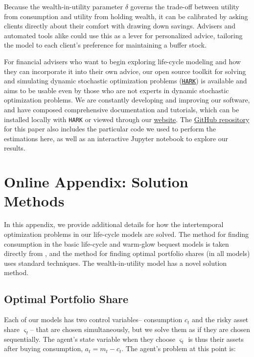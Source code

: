 \documentclass[12pt,letterpaper, fleqn]{article}
\newcommand{\cNrm}{c}
\newcommand{\mNrm}{m}
\newcommand{\aNrm}{a}
\begin{document}
Because the wealth-in-utility parameter $\delta$ governs the trade-off between utility from consumption and utility from holding wealth, it can be calibrated by asking clients directly about their comfort with drawing down savings.
Advisers and automated tools alike could use this as a lever for personalized advice, tailoring the model to each client's preference for maintaining a buffer stock.

For financial advisers who want to begin exploring life-cycle modeling and how they can incorporate it into their own advice, our open source toolkit for solving and simulating dynamic stochastic optimization problems (\href{https://github.com/econ-ark/HARK}{\texttt{HARK}}) is available and aims to be usable even by those who are not experts in dynamic stochastic optimization problems.
We are constantly developing and improving our software, and have composed comprehensive documentation and tutorials, which can be installed locally with \texttt{HARK} or viewed through our \href{https://econ-ark.org}{website}.
The \href{https://github.com/econ-ark/life-cycle-prime-time}{GitHub repository} for this paper also includes the particular code we used to perform the estimations here, as well as an interactive Jupyter notebook to explore our results.




\newpage

\appendix
\section{Online Appendix: Solution Methods}

In this appendix, we provide additional details for how the intertemporal optimization problems in our life-cycle models are solved. The method for finding consumption in the basic life-cycle and warm-glow bequest models is taken directly from \cite{CarrollEGM}, and the method for finding optimal portfolio shares (in all models) uses standard techniques. The wealth-in-utility model has a novel solution method.

\subsection{Optimal Portfolio Share}

Each of our models has two control variables-- consumption $\cNrm_t$ and the risky asset share $\varsigma_t$-- that are chosen simultaneously, but we solve them as if they are chosen sequentially. The agent's state variable when they choose $\varsigma_t$ is thus their assets after buying consumption, $\aNrm_t = \mNrm_t - \cNrm_t$. The agent's problem at this point is:
\end{document}

